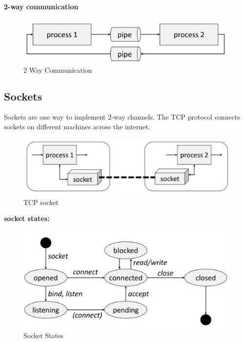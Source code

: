 \documentclass{article}
\begin{document}
\textbf{2-way communication}

\begin{figure}[h]
    \centering
    \includegraphics[scale=0.3]{images/pipe-2-way-communication.png}
   \caption{2 Way Communication}
    \label{fig:my_label}
\end{figure}



\subsection{Sockets}

Sockets are one way to implement 2-way channels. The TCP protocol connects sockets on different machines across the internet.

\begin{figure}[h]
    \centering
    \includegraphics[scale=0.3]{images/tcp-socket.png}
   \caption{TCP socket}
    \label{fig:my_label}
\end{figure}


\textbf{socket states:}

\begin{figure}[h]
    \centering
    \includegraphics[scale=0.3]{images/socket-states.png}
   \caption{Socket States}
    \label{fig:my_label}
\end{figure}
\end{document}
